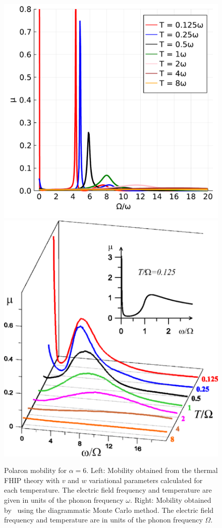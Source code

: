\begin{figure}[t]
    \centering
    \includegraphics[width=.49\textwidth]{figures/Mischenko_comparison.pdf}
    \includegraphics[width=.49\textwidth]{figures/medium.png}
    
    \caption{Polaron mobility for $\alpha = 6$. Left: Mobility obtained from the thermal FHIP theory with $v$ and $w$ variational parameters calculated for each temperature. The electric field frequency and temperature are given in units of the phonon frequency $\omega$. Right: Mobility obtained by~\cite{mishchenko_polaron_2019} using the diagrammatic Monte Carlo method. The electric field frequency and temperature are in units of the phonon frequency $\Omega$.}
    \label{fig:mishchenko}
\end{figure}

